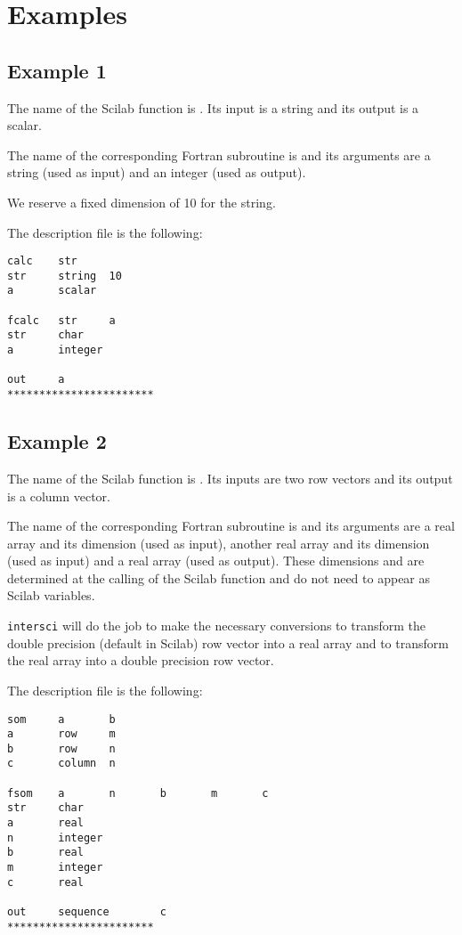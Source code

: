 \section{Examples}

\subsection{Example 1}
\label{ex1}

The name of the Scilab function is . Its input is a string and its
output is a scalar.

The name of the corresponding Fortran subroutine is  and its arguments
are a string (used as input) and an integer (used as output).

We reserve a fixed dimension of 10 for the string.

The description file is the following:
\begin{verbatim}
calc    str
str     string  10
a       scalar

fcalc   str     a
str     char
a       integer

out     a
***********************
\end{verbatim}

\subsection{Example 2}
\label{ex2}

The name of the Scilab function is . Its inputs are two row vectors and
its  output is a column vector.

The name of the corresponding Fortran subroutine is  and its arguments
are a real array and its dimension (used as input), another 
real array and its dimension (used as input) and a real array (used as output).
These dimensions  and  are determined at the calling of the Scilab
function and do not need to appear as Scilab variables.

{\tt intersci} will do the job to make the necessary conversions to transform the
double precision (default in Scilab) row vector  into a real array and to
transform the real array  into a double precision row vector.

The description file is the following:
\begin{verbatim}
som     a       b
a       row     m
b       row     n
c       column  n

fsom    a       n       b       m       c
str     char
a       real
n       integer
b       real
m       integer
c       real

out     sequence        c
***********************
\end{verbatim}

